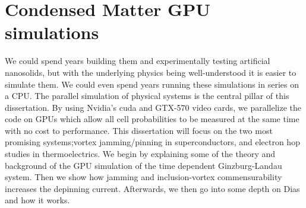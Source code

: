 \section{Condensed Matter GPU simulations}
 We could spend years building them and experimentally testing artificial nanosolids, but with the underlying physics being well-understood it is easier to simulate them.  We could even spend years running these simulations in series on a CPU. The parallel simulation of physical systems is the central pillar of this dissertation.  By using Nvidia's {\sc cuda} and GTX-570 video cards, we parallelize the code on GPUs which allow all cell probabilities to be measured at the same time with no cost to performance. This dissertation will focus on the two most promising systems;vortex jamming/pinning in superconductors, and electron hop studies in thermoelectrics. We begin by explaining some of the theory and background of the GPU simulation of the time dependent Ginzburg-Landau system. Then we show how jamming and inclusion-vortex commensurability increases the depinning current. Afterwards, we then go into some depth on Dias and how it works. 


